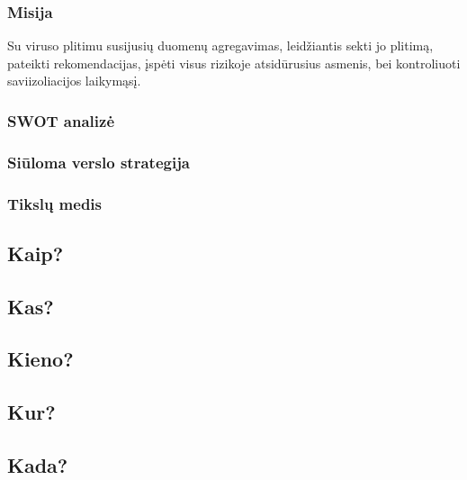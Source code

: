 \documentclass{VUMIFPSkursinis}
\begin{document}
\subsubsection{Misija}
Su viruso plitimu susijusių duomenų agregavimas, leidžiantis sekti jo plitimą, pateikti rekomendacijas,
įspėti visus rizikoje atsidūrusius asmenis, bei kontroliuoti saviizoliacijos laikymąsį.

\subsubsection{SWOT analizė}

\subsubsection{Siūloma verslo strategija}

\subsubsection{Tikslų medis}

\subsection{Kaip?}

\subsection{Kas?}

\subsection{Kieno?}

\subsection{Kur?}

\subsection{Kada?}
\end{document}
